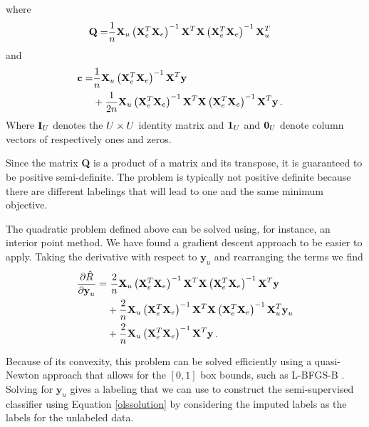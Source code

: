 \documentclass{elsarticle}
\begin{document}
where
\begin{equation}
\begin{aligned}
\textbf{Q} = & \frac{1}{n}  \textbf{X}_u \left(\mathbf{X}_e^T \mathbf{X}_e \right)^{-1} \textbf{X}^T \textbf{X} \left(\mathbf{X}_e^T \mathbf{X}_e \right)^{-1} \textbf{X}_u^T &\\
\end{aligned} \nonumber
\end{equation}
and
\begin{equation}
\begin{aligned}
\textbf{c} = & \frac{1}{n}  \textbf{X}_u \left(\mathbf{X}_e^T \mathbf{X}_e \right)^{-1} \textbf{X}^T  \textbf{y} & \\
& + \frac{1}{2 n} \textbf{X}_u \left(\mathbf{X}_e^T \mathbf{X}_e \right)^{-1} \textbf{X}^T \textbf{X} \left(\mathbf{X}_e^T \mathbf{X}_e \right)^{-1} \textbf{X}^T \textbf{y} \, . &\\
\end{aligned} \nonumber
\end{equation}
Where $\textbf{I}_{U}$ denotes the $U \times U$ identity matrix and $\textbf{1}_{U}$ and $\textbf{0}_{U}$ denote column vectors of respectively ones and zeros.

Since the matrix \textbf{Q} is a product of a matrix and its transpose, it is guaranteed to be positive semi-definite. The problem is typically not positive definite because there are different labelings that will lead to one and the same minimum objective. 

The quadratic problem defined above can be solved using, for instance, an interior point method. We have found a gradient descent approach to be easier to apply. Taking the derivative with respect to $\textbf{y}_u$ and rearranging the terms we find
\begin{align}
\frac { \partial \hat{R} }{ \partial \textbf{y}_u } = & \ \frac{2}{n}  \textbf{X}_u \G \textbf{X}^T \textbf{X} \G \textbf{X}^T \textbf{y} \nonumber  \\
 & +  \frac{2}{n}  \textbf{X}_u \G \textbf{X}^T  \textbf{X}  \G  \textbf{X}_u^T \textbf{y}_u  \nonumber \\
 & +  \frac{2}{n}  \textbf{X}_u \G \textbf{X}^T  \textbf{y} \, . \nonumber
\end{align}

Because of its convexity, this problem can be solved efficiently using a quasi-Newton approach that allows for the  $[0,1]$ box bounds, such as L-BFGS-B \cite{Byrd1995}. Solving for $\mathbf{y}_u$ gives a labeling that we can use to construct the semi-supervised classifier using Equation \eqref{olssolution} by considering the imputed labels as the labels for the unlabeled data.
\end{document}
